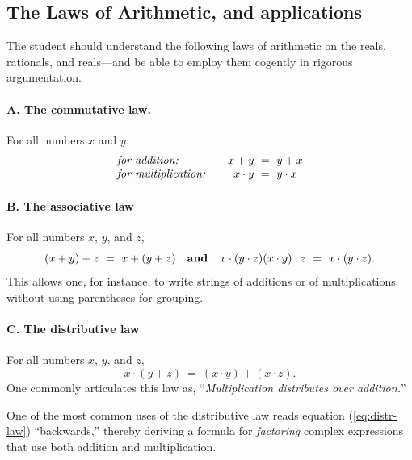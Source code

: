 \subsection{The Laws of Arithmetic, and applications}
\label{sec:Arithmetic-Laws}

The student should understand the following laws of arithmetic on the
reals, rationals, and reals---and be able to employ them cogently in
rigorous argumentation.


\paragraph{\small\sf A. The commutative law.}

For all numbers $x$ and $y$:
\[
\begin{array}{llc}
\mbox{\it for addition:}
  & & x+y \ = \ y+x \\
\mbox{\it for multiplication:}
  & & x \cdot y \ = \ y \cdot x
\end{array}
\]


\paragraph{\small\sf B. The associative law}

For all numbers $x$, $y$, and $z$,
\[ (x+y)+z \ = \ x+(y+z) \ \ \ \mbox{\bf and } \ \ 
x\cdot (y\cdot z) 
(x \cdot y) \cdot z \ = \ x\cdot (y\cdot z). \] 
This allows one, for instance, to write strings of additions or of
multiplications without using parentheses for grouping.


\paragraph{\small\sf C. The distributive law}

For all numbers $x$, $y$, and $z$,
\begin{equation}
\label{eq:distr-law}
x \cdot (y + z) \ = \ (x \cdot y) + (x \cdot z).
\end{equation}
One commonly articulates this law as, ``{\em Multiplication
  distributes over addition.}''


One of the most common uses of the distributive law reads equation
(\ref{eq:distr-law}) ``backwards,'' thereby deriving a formula for
{\em factoring} \index{arithmetic!factoring} complex expressions that
use both addition and multiplication.

